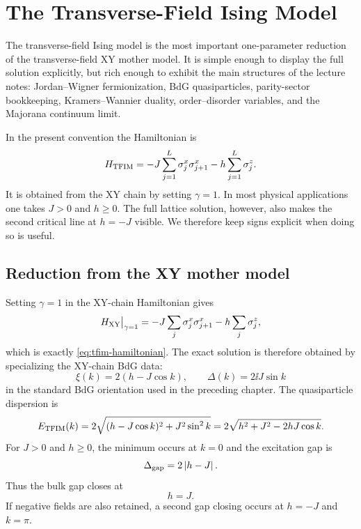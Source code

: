 \chapter{The Transverse-Field Ising Model}
\label{chap:tfim}

The transverse-field Ising model is the most important one-parameter reduction of
the transverse-field XY mother model.  It is simple enough to display the full
solution explicitly, but rich enough to exhibit the main structures of the
lecture notes: Jordan--Wigner fermionization, BdG quasiparticles, parity-sector
bookkeeping, Kramers--Wannier duality, order--disorder variables, and the
Majorana continuum limit.

In the present convention the Hamiltonian is
\begin{equation}
\label{eq:tfim-hamiltonian}
    H_{\rm TFIM}
    =
    -J\sum_{j=1}^{L}\sigma_j^x\sigma_{j+1}^x
    -h\sum_{j=1}^{L}\sigma_j^z .
\end{equation}
It is obtained from the XY chain by setting $\gamma=1$.  In most physical
applications one takes $J>0$ and $h\geq0$.  The full lattice solution, however,
also makes the second critical line at $h=-J$ visible.  We therefore keep signs
explicit when doing so is useful.

\section{Reduction from the XY mother model}
\label{sec:tfim-from-xy-mother}

Setting $\gamma=1$ in the XY-chain Hamiltonian gives
\begin{equation}
    H_{\rm XY}\big|_{\gamma=1}
    =
    -J\sum_j\sigma_j^x\sigma_{j+1}^x
    -h\sum_j\sigma_j^z,
\end{equation}
which is exactly \cref{eq:tfim-hamiltonian}.  The exact solution is therefore
obtained by specializing the XY-chain BdG data:
\begin{equation}
\label{eq:tfim-xi-delta-from-xy}
    \xi(k)=2(h-J\cos k),
    \qquad
    \Delta(k)=2\ii J\sin k
\end{equation}
in the standard BdG orientation used in the preceding chapter.  The
quasiparticle dispersion is
\begin{equation}
\label{eq:tfim-spectrum}
    E_{\rm TFIM}(k)
    =
    2\sqrt{(h-J\cos k)^2+J^2\sin^2 k}
    =
    2\sqrt{h^2+J^2-2hJ\cos k}.
\end{equation}
For $J>0$ and $h\geq0$, the minimum occurs at $k=0$ and the excitation gap is
\begin{equation}
\label{eq:tfim-gap-positive-field}
    \Delta_{\rm gap}=2\left|h-J\right|.
\end{equation}
Thus the bulk gap closes at
\begin{equation}
\label{eq:tfim-critical-point}
    h=J.
\end{equation}
If negative fields are also retained, a second gap closing occurs at $h=-J$ and
$k=\pi$.

